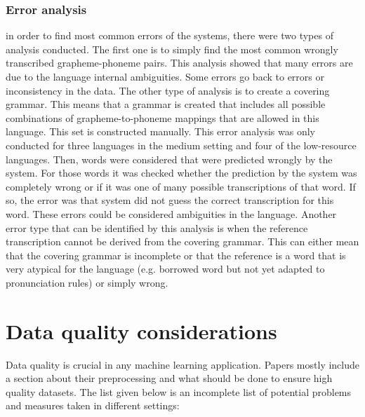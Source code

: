 \subsubsection*{Error analysis}
in order to find most common errors of the systems, there were two types of analysis conducted. The first one is to simply find the most common wrongly transcribed grapheme-phoneme pairs. This analysis showed that many errors are due to the language internal ambiguities. Some errors go back to errors or inconsistency in the data. 
The other type of analysis is to create a covering grammar. This means that a grammar is created that includes all possible combinations of grapheme-to-phoneme mappings that are allowed in this language. This set is constructed manually. This error analysis was only conducted for three languages in the medium setting and four of the low-resource languages. Then, words were considered that were predicted wrongly by the system. For those words it was checked whether the prediction by the system was completely wrong or if it was one of many possible transcriptions of that word. If so, the error was that system did not guess the correct transcription for this word. These errors could be considered ambiguities in the language. Another error type that can be identified by this analysis is when the reference transcription cannot be derived from the covering grammar. This can either mean that the covering grammar is incomplete or that the reference is a word that is very atypical for the language (e.g. borrowed word but not yet adapted to pronunciation rules) or simply wrong. 

\section{Data quality considerations}
\label{data_qual}
Data quality is crucial in any machine learning application. Papers mostly include a section about their preprocessing and what should be done to ensure high quality datasets. The list given below is an incomplete list of potential problems and measures taken in different settings:

